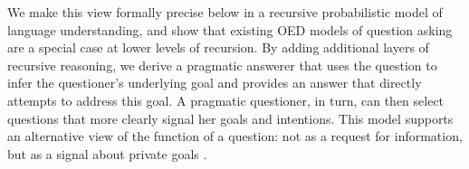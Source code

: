 \documentclass[11pt, floatsintext]{apa6}
\begin{document}
We make this view formally precise below in a recursive probabilistic model of language understanding, and show that existing OED models of question asking are a special case at lower levels of recursion.
By adding additional layers of recursive reasoning, we derive a pragmatic answerer that uses the question to infer the questioner's underlying goal and provides an answer that directly attempts to address this goal. 
A pragmatic questioner, in turn, can then select questions that more clearly signal her goals and intentions.
This model supports an alternative view of the function of a question: not as a request for information, but as a signal about private goals \cite{de2012questions}.

%




%
\end{document}
